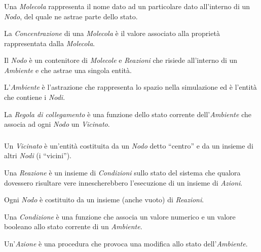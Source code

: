 \begin{frame}
    \frametitle{\insertsection}
    \framesubtitle{\insertsubsection}

    \begin{description}[<+->]
        \item[Molecola]\label{itm:mol}
            Una \emph{Molecola} rappresenta il nome dato ad un particolare dato all'interno di un \emph{Nodo}, del quale ne astrae parte dello stato.

        \item[Concentrazione]\label{itm:conc}
            La \emph{Concentrazione} di una \emph{Molecola} è il valore associato alla proprietà rappresentata dalla \emph{Molecola}.

        \item[Nodo]\label{itm:node}
            Il \emph{Nodo} è un contenitore di \emph{Molecole} e \emph{Reazioni} che risiede all'interno di un \emph{Ambiente} e che astrae una singola entità.

        \item[Ambiente]\label{itm:env}
            L'\emph{Ambiente} è l'astrazione che rappresenta lo spazio nella simulazione ed è l'entità che contiene i \emph{Nodi}.

        \item[Regola di collegamento]\label{itm:linkr}
            La \emph{Regola di collegamento} è una funzione dello stato corrente dell'\emph{Ambiente} che associa ad ogni \emph{Nodo} un \emph{Vicinato}.
    \end{description}
\end{frame}

\begin{frame}
    \frametitle{\insertsection}
    \framesubtitle{\insertsubsection}

    \begin{description}[<+->]
        \item[Vicinato]\label{itm:neigh}
            Un \emph{Vicinato} è un'entità costituita da un \emph{Nodo} detto ``centro'' e da un insieme di altri \emph{Nodi} (i ``vicini'').

        \item[Reazione]\label{itm:react}
            Una \emph{Reazione} è un insieme di \emph{Condizioni} sullo stato del sistema che qualora dovessero risultare vere innescherebbero l'esecuzione di un insieme di \emph{Azioni}.

            Ogni \emph{Nodo} è costituito da un insieme (anche vuoto) di \emph{Reazioni}.

        \item[Condizione]\label{itm:cond}
            Una \emph{Condizione} è una funzione che associa un valore numerico e un valore booleano allo stato corrente di un \emph{Ambiente}.

        \item[Azione]\label{itm:act}
            Un'\emph{Azione} è una procedura che provoca una modifica allo stato dell'\emph{Ambiente}.
    \end{description}
\end{frame}
